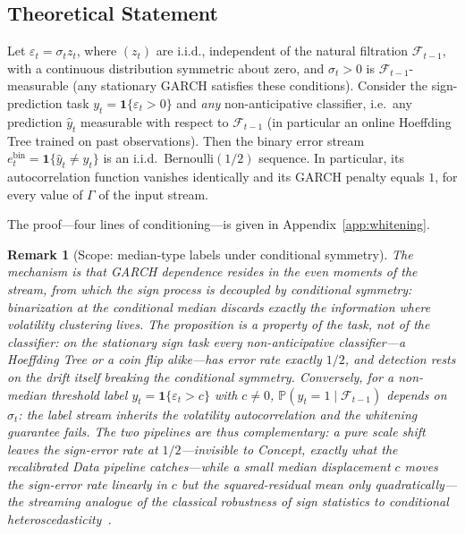 \documentclass[sigconf,anonymous,review]{acmart}
\theoremstyle{acmdefinition}
\newtheorem{remark}[theorem]{Remark}
\begin{document}
\subsection{Theoretical Statement}

\begin{proposition}\label{prop:whitening}
    Let $\varepsilon_t = \sigma_t z_t$, where $(z_t)$ are i.i.d., independent of the natural filtration $\mathcal{F}_{t-1}$, with a continuous distribution symmetric about zero, and $\sigma_t > 0$ is $\mathcal{F}_{t-1}$-measurable (any stationary GARCH satisfies these conditions).
    Consider the sign-prediction task $y_t = \mathbf{1}\{\varepsilon_t > 0\}$ and \emph{any} non-anticipative classifier, i.e.\ any prediction $\widehat{y}_t$ measurable with respect to $\mathcal{F}_{t-1}$ (in particular an online Hoeffding Tree trained on past observations).
    Then the binary error stream $e^{\mathrm{bin}}_t = \mathbf{1}\{\widehat{y}_t \neq y_t\}$ is an i.i.d.\ Bernoulli$(1/2)$ sequence.
    In particular, its autocorrelation function vanishes identically and its GARCH penalty equals $1$, for every value of $\Gamma$ of the input stream.
\end{proposition}

\noindent The proof---four lines of conditioning---is given in Appendix~\ref{app:whitening}.

\begin{remark}[Scope: median-type labels under conditional symmetry]\label{rem:scope}
    The mechanism is that GARCH dependence resides in the \emph{even} moments of the stream, from which the sign process is decoupled by conditional symmetry: binarization at the conditional median discards exactly the information where volatility clustering lives.
    The proposition is a property of the \emph{task}, not of the classifier: on the stationary sign task every non-anticipative classifier---a Hoeffding Tree or a coin flip alike---has error rate exactly $1/2$, and detection rests on the drift itself breaking the conditional symmetry.
    Conversely, for a non-median threshold label $y_t = \mathbf{1}\{\varepsilon_t > c\}$ with $c \neq 0$, $\mathbb{P}(y_t = 1 \mid \mathcal{F}_{t-1})$ depends on $\sigma_t$: the label stream inherits the volatility autocorrelation and the whitening guarantee fails.
    The two pipelines are thus complementary: a pure scale shift leaves the sign-error rate at $1/2$---invisible to Concept, exactly what the recalibrated Data pipeline catches---while a small median displacement $c$ moves the sign-error rate \emph{linearly} in $c$ but the squared-residual mean only \emph{quadratically}---the streaming analogue of the classical robustness of sign statistics to conditional heteroscedasticity~\cite{campbell_dufour_1995}.
\end{remark}
\end{document}
